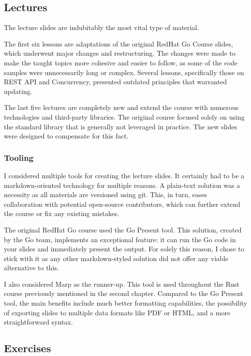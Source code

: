 \documentclass[
  digital,
  color,
  oneside,
  nosansbold,
  nocolorbold,
  lof,
  lot,
]{fithesis4}
\begin{document}
\subsection{Lectures}

The lecture slides are indubitably the most vital type of material. 

The first six lessons are adaptations of the original RedHat Go Course slides, which underwent major changes and restructuring. The changes were made to make the taught topics more cohesive and easier to follow, as some of the code samples were unnecessarily long or complex. Several lessons, specifically those on REST API and Concurrency, presented outdated principles that warranted updating.

The last five lectures are completely new and extend the course with numerous technologies and third-party libraries. The original course focused solely on using the standard library that is generally not leveraged in practice. The new slides were designed to compensate for this fact.

\subsubsection{Tooling}

I considered multiple tools for creating the lecture slides. It certainly had to be a markdown-oriented technology for multiple reasons. A plain-text solution was a necessity as all materials are versioned using git. This, in turn, eases collaboration with potential open-source contributors, which can further extend the course or fix any existing mistakes.

The original RedHat Go course used the Go Present tool. This solution, created by the Go team, implements an exceptional feature: it can run the Go code in your slides and immediately present the output. For solely this reason, I chose to stick with it as any other markdown-styled solution did not offer any viable alternative to this.

I also considered Marp as the runner-up. This tool is used throughout the Rust course previously mentioned in the second chapter. Compared to the Go Present tool, the main benefits include much better formatting capabilities, the possibility of exporting slides to multiple data formats like PDF or HTML, and a more straightforward syntax.

\subsection{Exercises}
\end{document}
